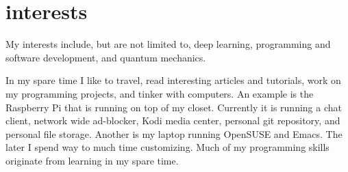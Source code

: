 \documentclass[]{twentysecondcv}
\begin{document}






\makeprofile


\section{interests}
My interests include, but are not limited to, deep learning,
programming and software development, and quantum mechanics.

In my spare time I like to travel, read interesting articles and
tutorials, work on my programming projects, and
tinker with computers. An example is the Raspberry Pi that is running on
top of my closet. Currently it is  running a chat client, network wide ad-blocker, Kodi
media center, personal git repository, and personal file storage. Another is my
laptop running OpenSUSE and Emacs. The later I spend way to much time
customizing. Much of my programming skills originate from learning in
my spare time.
\end{document}
